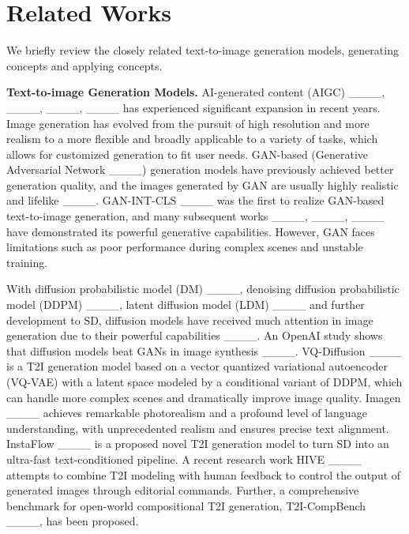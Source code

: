 \section{Related Works}
We briefly review the closely related text-to-image generation models, generating concepts and applying concepts.

\textbf{Text-to-image Generation Models.} AI-generated content (AIGC) ____, ____, ____, ____ has experienced significant expansion in recent years. Image generation has evolved from the pursuit of high resolution and more realism to a more flexible and broadly applicable to a variety of tasks, which allows for customized generation to fit user needs. GAN-based (Generative Adversarial Network ____) generation models have previously achieved better generation quality, and the images generated by GAN are usually highly realistic and lifelike ____. GAN-INT-CLS ____ was the first to realize GAN-based text-to-image generation, and many subsequent works ____, ____, ____ have demonstrated its powerful generative capabilities. However, GAN faces limitations such as poor performance during complex scenes and unstable training.

With diffusion probabilistic model (DM) ____, denoising diffusion probabilistic model (DDPM) ____, latent diffusion model (LDM) ____ and further development to SD, diffusion models have received much attention in image generation due to their powerful capabilities ____. An OpenAI study shows that diffusion models beat GANs in image synthesis ____. VQ-Diffusion ____ is a T2I generation model based on a vector quantized variational autoencoder (VQ-VAE) with a latent space modeled by a conditional variant of DDPM, which can handle more complex scenes and dramatically improve image quality. Imagen ____ achieves remarkable photorealism and a profound level of language understanding, with unprecedented realism and ensures precise text alignment. InstaFlow ____ is a proposed novel T2I generation model to turn SD into an ultra-fast text-conditioned pipeline. A recent research work HIVE ____ attempts to combine T2I modeling with human feedback to control the output of generated images through editorial commands. Further, a comprehensive benchmark for open-world compositional T2I generation, T2I-CompBench ____, has been proposed.

